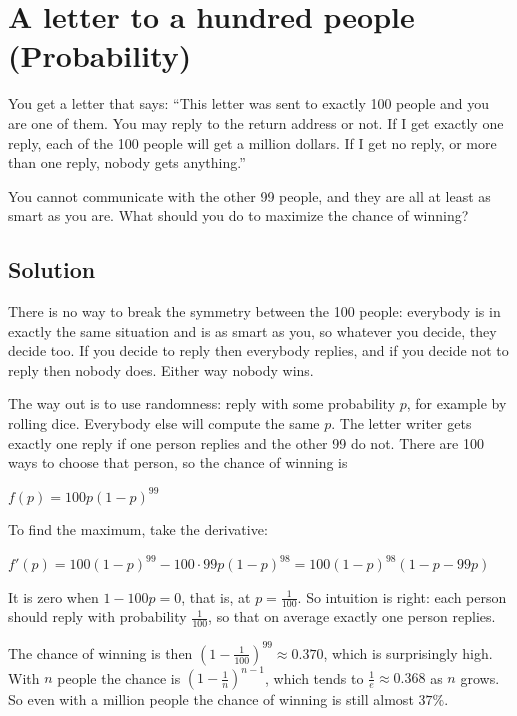 \section {A letter to a hundred people (Probability)}

You get a letter that says: ``This letter was sent to exactly 100 people and you are one of them.
You may reply to the return address or not. If I get exactly one reply, each of the 100 people will get a million dollars.
If I get no reply, or more than one reply, nobody gets anything.''

You cannot communicate with the other 99 people, and they are all at least as smart as you are.
What should you do to maximize the chance of winning?

\subsection{Solution}

There is no way to break the symmetry between the 100 people: everybody is in exactly the same situation and is as smart as you,
so whatever you decide, they decide too. If you decide to reply then everybody replies, and if you decide not to reply then nobody does.
Either way nobody wins.

The way out is to use randomness: reply with some probability $p$, for example by rolling dice.
Everybody else will compute the same $p$. The letter writer gets exactly one reply if one person replies and the other 99 do not.
There are 100 ways to choose that person, so the chance of winning is
\begin{center}
$f(p) = 100p(1-p)^{99}$
\end{center}
To find the maximum, take the derivative:
\begin{center}
$f'(p) = 100(1-p)^{99} - 100 \cdot 99 p (1-p)^{98} = 100(1-p)^{98}(1-p-99p)$
\end{center}
It is zero when $1 - 100p = 0$, that is, at $p = \frac{1}{100}$.
So intuition is right: each person should reply with probability $\frac{1}{100}$, so that on average exactly one person replies.

The chance of winning is then $\left(1-\frac{1}{100}\right)^{99} \approx 0.370$, which is surprisingly high.
With $n$ people the chance is $\left(1-\frac{1}{n}\right)^{n-1}$, which tends to $\frac{1}{e} \approx 0.368$ as $n$ grows.
So even with a million people the chance of winning is still almost $37\%$.
